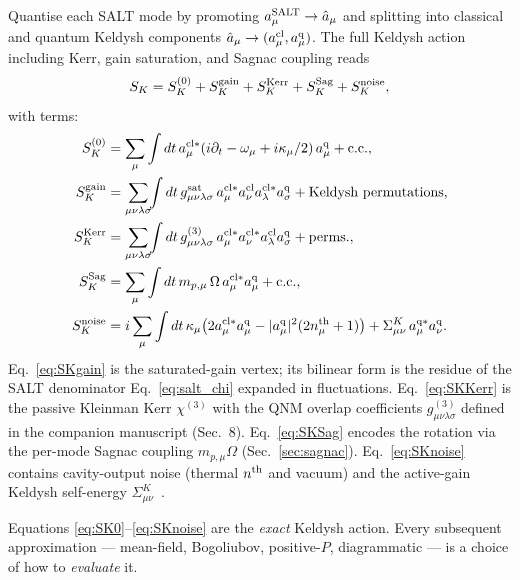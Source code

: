 \documentclass[11pt]{article}
\begin{document}
Quantise each SALT mode by promoting $a_\mu^{\rm SALT}\to\hat a_\mu$
and splitting into classical and quantum Keldysh components
$\hat a_\mu\to (a_\mu^{\rm cl}, a_\mu^{\rm q})$.  The full Keldysh
action including Kerr, gain saturation, and Sagnac coupling reads
\begin{equation}
  S_K = S_K^{(0)} + S_K^{\rm gain} + S_K^{\rm Kerr} + S_K^{\rm Sag}
        + S_K^{\rm noise},
\end{equation}
with terms:
\begin{align}
  S_K^{(0)} &= \sum_\mu\int dt\,a_\mu^{\rm cl*}\!\left(i\partial_t
                - \omega_\mu + i\kappa_\mu/2\right)a_\mu^{\rm q} + \mathrm{c.c.},
  \label{eq:SK0}\\
  S_K^{\rm gain} &= \sum_{\mu\nu\lambda\sigma}\!\!\int dt\,
                 g^{\rm sat}_{\mu\nu\lambda\sigma}\,
                 a_\mu^{\rm cl*}a_\nu^{\rm cl}a_\lambda^{\rm cl*}a_\sigma^{\rm q}
                 + \text{Keldysh permutations},
  \label{eq:SKgain}\\
  S_K^{\rm Kerr} &= \sum_{\mu\nu\lambda\sigma}\!\!\int dt\,
                 g^{(3)}_{\mu\nu\lambda\sigma}\,
                 a_\mu^{\rm cl*}a_\nu^{\rm cl*}a_\lambda^{\rm cl}a_\sigma^{\rm q}
                 + \text{perms.},
  \label{eq:SKKerr}\\
  S_K^{\rm Sag} &= \sum_\mu \int dt\, m_{p,\mu}\,\Omega\,
                 a_\mu^{\rm cl*}a_\mu^{\rm q}+\text{c.c.},
  \label{eq:SKSag}\\
  S_K^{\rm noise} &= i\sum_\mu\int dt\,\kappa_\mu\bigl(2a_\mu^{\rm cl*}a_\mu^{\rm q}
                - |a_\mu^{\rm q}|^2(2n^{\rm th}_\mu+1)\bigr)
                + \Sigma^K_{\mu\nu}\,a_\mu^{\rm q*}a_\nu^{\rm q}.
  \label{eq:SKnoise}
\end{align}
Eq.~\eqref{eq:SKgain} is the saturated-gain vertex; its bilinear form
is the residue of the SALT denominator Eq.~\eqref{eq:salt_chi}
expanded in fluctuations.  Eq.~\eqref{eq:SKKerr} is the passive Kleinman
Kerr $\chi^{(3)}$ with the QNM overlap coefficients
$g^{(3)}_{\mu\nu\lambda\sigma}$ defined in the companion manuscript
(Sec.~8).  Eq.~\eqref{eq:SKSag} encodes the rotation via the per-mode
Sagnac coupling $m_{p,\mu}\Omega$ (Sec.~\ref{sec:sagnac}).
Eq.~\eqref{eq:SKnoise} contains cavity-output noise (thermal $n^{\rm th}$
and vacuum) and the active-gain Keldysh self-energy
$\Sigma^K_{\mu\nu}$~\cite{Pick2015,LentrodtEvers2020}.

Equations \eqref{eq:SK0}--\eqref{eq:SKnoise} are the \emph{exact}
Keldysh action.  Every subsequent approximation --- mean-field,
Bogoliubov, positive-$P$, diagrammatic --- is a choice of how to
\emph{evaluate} it.
\end{document}
